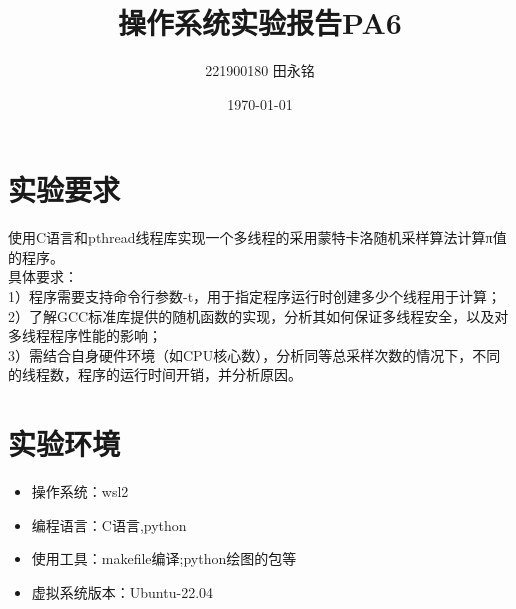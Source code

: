 \documentclass{LabReport}
\title{操作系统实验报告PA6}
\author{221900180 田永铭}
\date{\today}
\begin{document}
	\maketitle
	
	\tableofcontents
	
	\newpage
	
	\section{实验要求}
使用C语言和pthread线程库实现一个多线程的采用蒙特卡洛随机采样算法计算π值的程序。\\
具体要求：\\
1）程序需要支持命令行参数-t，用于指定程序运行时创建多少个线程用于计算；\\
2）了解GCC标准库提供的随机函数的实现，分析其如何保证多线程安全，以及对多线程程序性能的影响；\\
3）需结合自身硬件环境（如CPU核心数），分析同等总采样次数的情况下，不同的线程数，程序的运行时间开销，并分析原因。

	\section{实验环境}
	
	\begin{itemize}
		\item 操作系统：wsl2
		\item 编程语言：C语言,python
		\item 使用工具：makefile编译;python绘图的包等
		\item 虚拟系统版本：Ubuntu-22.04
	\end{itemize}
	
\end{document}
